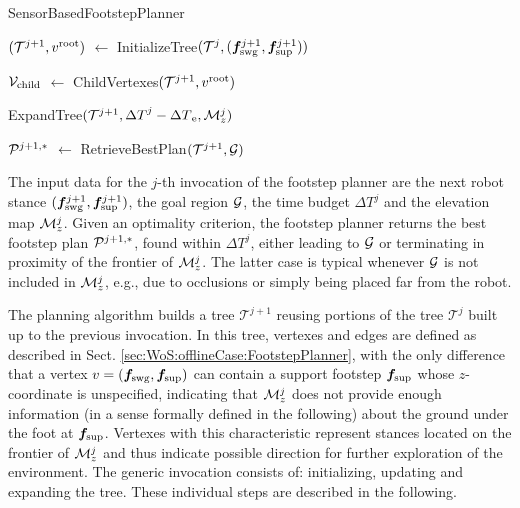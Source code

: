 \begin{algorithm}%
	\small
	\removelatexerror
	
	\caption{SensorBasedFootstepPlanner}
	\label{alg:AnytimeFootstepPlanner}

	\vspace{2pt}
    \BlankLine

    $({\cal T}^{j+1}, v^{\rm root})$ $\leftarrow$ InitializeTree$({\cal T}^j, ({{\bm{f}}}_{\rm swg}^{j+1}, {{\bm{f}}}_{\rm sup}^{j+1}))$\; 
	
    ${\cal V}_{\rm child}$ $\leftarrow$ ChildVertexes$({\cal T}^{j+1}, v^{\rm root})$\;

	ExpandTree$({\cal T}^{j+1}, {\Delta T}^j - {\Delta T}_{\rm e}, {\cal M}_z^j)$\;

	${\cal P}^{j+1,*}$ $\leftarrow$ RetrieveBestPlan$({\cal T}^{j+1}, {\cal G})$\;
    \;
\end{algorithm}

The input data for the $j$-th invocation of the footstep planner are the next
robot stance $({\bm{f}}_{\rm swg}^{j+1}, {\bm{f}}_{\rm sup}^{j+1})$, the goal region
$\cal G$, the time budget ${\Delta T}^j$ and the elevation map ${\cal M}_z^j$. 
Given an optimality criterion, the footstep planner returns the best footstep
plan ${\cal P}^{j+1,*}$, found within ${\Delta T}^j$, either leading to $\cal G$
or terminating in proximity of the frontier of ${\cal M}_z^j$.
The latter case is typical whenever $\cal G$ is not included in ${\cal M}_z^j$,
e.g., due to occlusions or simply being placed far from the robot.

The planning algorithm builds a tree $\mathcal{T}^{j+1}$ reusing portions of
the tree $\mathcal{T}^{j}$ built up to the previous invocation. 
In this tree, vertexes and edges are defined as described in
Sect. \ref{sec:WoS:offlineCase:FootstepPlanner}, with the only difference that
a vertex $v = ({\bm{f}}_{\rm swg}, {\bm{f}}_{\rm sup})$ can contain a support footstep
${\bm{f}}_{\rm sup}$ whose $z$-coordinate is unspecified, indicating that
${\cal M}_z^j$ does not provide enough information (in a sense formally defined
in the following) about the ground under the foot at ${\bm{f}}_{\rm sup}$. 
Vertexes with this characteristic represent stances located on the frontier of
${\cal M}_z^j$ and thus indicate possible direction for further exploration of
the environment. 
%
The generic invocation consists of: initializing, updating and expanding the
tree. These individual steps are described in the following.

